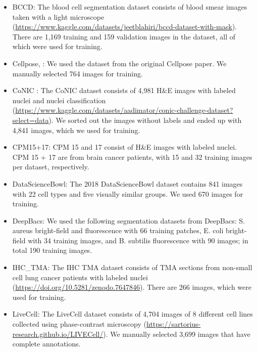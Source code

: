 \begin{itemize}
  \item BCCD\cite{BCCD}: The blood cell segmentation dataset consists of blood smear images taken with a light microscope 
  (\url{https://www.kaggle.com/datasets/jeetblahiri/bccd-dataset-with-mask}). 
  There are 1,169 training and 159 validation images in the dataset, all of which were used for training.

  \item Cellpose\cite{Stringer.2020}, \cite{israel2023foundationmodelcellsegmentation}: We used the dataset from the original Cellpose paper. We manually selected 764 images for training.

  \item CoNIC \cite{ConIC}: The CoNIC dataset consists of 4,981 H\&E images with labeled nuclei and nuclei classification 
  (\url{https://www.kaggle.com/datasets/aadimator/conic-challenge-dataset?select=data}). 
  We sorted out the images without labels and ended up with 4,841 images, which we used for training.

  \item CPM15+17\cite{CPM}\cite{TNBC}: CPM 15 and 17 consist of H\&E images with labeled nuclei. CPM 15 + 17 are from brain cancer patients, with 15 and 32 training images per dataset, respectively.

  \item DataScienceBowl\cite{DSB18}: The 2018 DataScienceBowl dataset contains 841 images with 22 cell types and five visually similar groups. We used 670 images for training.

  \item DeepBacs\cite{deepbacs}: We used the following segmentation datasets from DeepBacs: S. aureus bright-field and fluorescence with 66 training patches, E. coli bright-field with 34 training images, and B. subtilis fluorescence with 90 images; in total 190 training images.

  \item IHC\_TMA\cite{ihctma}: The IHC TMA dataset consists of TMA sections from non-small cell lung cancer patients with labeled nuclei 
  (\url{https://doi.org/10.5281/zenodo.7647846}). 
  There are 266 images, which were used for training.

  \item LiveCell\cite{livecell}: The LiveCell dataset consists of 4,704 images of 8 different cell lines collected using phase-contrast microscopy 
  (\url{https://sartorius-research.github.io/LIVECell/}). 
  We manually selected 3,699 images that have complete annotations.


\end{itemize}
